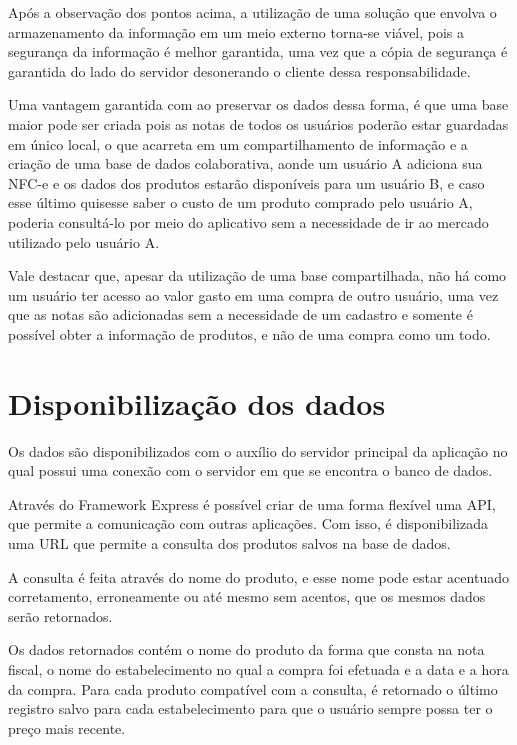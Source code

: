 Após a observação dos pontos acima, a utilização de uma solução que envolva o armazenamento da informação em um meio externo torna-se viável, pois a segurança da informação é melhor garantida, uma vez que a cópia de segurança é garantida do lado do servidor desonerando o cliente dessa responsabilidade.

Uma vantagem garantida com ao preservar os dados dessa forma, é que uma base maior pode ser criada pois as notas de todos os usuários poderão estar guardadas em único local, o que acarreta em um compartilhamento de informação e a criação de uma base de dados colaborativa, aonde um usuário A adiciona sua NFC-e e os dados dos produtos estarão disponíveis para um usuário B, e caso esse último quisesse saber o custo de um produto comprado pelo usuário A, poderia consultá-lo por meio do aplicativo sem a necessidade de ir ao mercado utilizado pelo usuário A.

Vale destacar que, apesar da utilização de uma base compartilhada, não há como um usuário ter acesso ao valor gasto em uma compra de outro usuário, uma vez que as notas são adicionadas sem a necessidade de um cadastro e somente é possível obter a informação de produtos, e não de uma compra como um todo.

\section{Disponibilização dos dados}



Os dados são disponibilizados com o auxílio do servidor principal da aplicação no qual possui uma conexão com o servidor em que se encontra o banco de dados.

Através do Framework Express é possível criar de uma forma flexível uma API, que permite a comunicação com outras aplicações. Com isso, é disponibilizada uma URL que permite a consulta dos produtos salvos na base de dados.

A consulta é feita através do nome do produto, e esse nome pode estar acentuado corretamento, erroneamente ou até mesmo sem acentos, que os mesmos dados serão retornados.

Os dados retornados contém o nome do produto da forma que consta na nota fiscal, o nome do estabelecimento no qual a compra foi efetuada e a data e a hora da compra. Para cada produto compatível com a consulta, é retornado o último registro salvo para cada estabelecimento para que o usuário sempre possa ter o preço mais recente.

